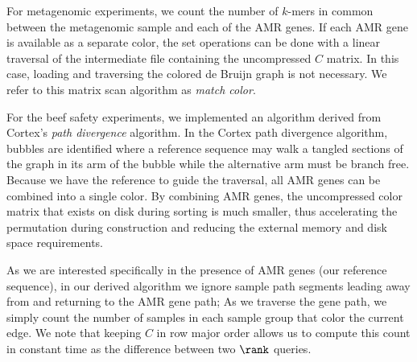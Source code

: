 For metagenomic experiments, we count the number of $k$-mers in common between the metagenomic sample and each of the AMR genes.  If each AMR gene is available as a separate color, the set operations can be done with a linear traversal of the intermediate file containing the uncompressed $C$ matrix.  In this case, loading and traversing the colored de Bruijn graph is not necessary.  We refer to this matrix scan algorithm as {\it match color}. 

For the beef safety experiments, we implemented an algorithm derived from {\sc Cortex}'s {\it path divergence} algorithm.  In the {\sc Cortex} path divergence algorithm, bubbles are identified where a reference sequence may walk a tangled sections of the graph in its arm of the bubble while the alternative arm must be branch free.  Because we have the reference to guide the traversal, all AMR genes can be combined into a single color.  By combining AMR genes, the uncompressed color matrix that exists on disk during sorting is much smaller, thus accelerating the permutation during construction and reducing the external memory and disk space requirements.

As we are interested specifically in the presence of AMR genes (our reference sequence), in our derived algorithm we ignore sample path segments leading away from and returning to the AMR gene path; As we traverse the gene path, we simply count the number of samples in each sample group that color the current edge.   We note that keeping $C$ in row major order allows us to compute this count in constant time as the difference between two $\rank$ queries.


